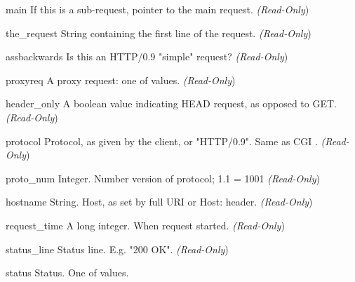 \begin{memberdesc}[Request]{main}
If this is a sub-request, pointer to the main request. 
\emph{(Read-Only})
\end{memberdesc}

\begin{memberdesc}[Request]{the_request}
String containing the first line of the request.
\emph{(Read-Only})
\end{memberdesc}

\begin{memberdesc}[Request]{assbackwards}
Is this an HTTP/0.9 "simple" request? 
\emph{(Read-Only})
\end{memberdesc}

\begin{memberdesc}[Request]{proxyreq}
A proxy request: one of  values.
\emph{(Read-Only})
\end{memberdesc}

\begin{memberdesc}[Request]{header_only}
A boolean value indicating HEAD request, as opposed to GET. 
\emph{(Read-Only})
\end{memberdesc}

\begin{memberdesc}[Request]{protocol}
Protocol, as given by the client, or "HTTP/0.9". Same as CGI .
\emph{(Read-Only})
\end{memberdesc}

\begin{memberdesc}[Request]{proto_num}
Integer. Number version of protocol; 1.1 = 1001 
\emph{(Read-Only})
\end{memberdesc}

\begin{memberdesc}[Request]{hostname}
String. Host, as set by full URI or Host: header.
\emph{(Read-Only})
\end{memberdesc}

\begin{memberdesc}[Request]{request_time}
A long integer. When request started.
\emph{(Read-Only})
\end{memberdesc}

\begin{memberdesc}[Request]{status_line}
Status line. E.g. "200 OK". 
\emph{(Read-Only})
\end{memberdesc}

\begin{memberdesc}[Request]{status}
Status. One of  values.
\end{memberdesc}

